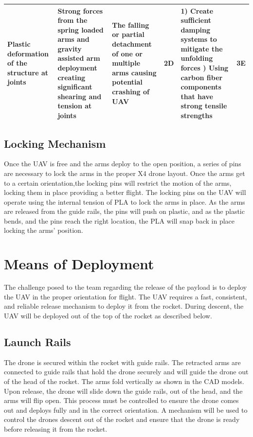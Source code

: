 \begin{table}[]
{\begin{tabularx}{\linewidth}{XXXlXl}
                Plastic deformation of the structure at joints & Strong forces from the spring loaded arms and gravity assisted arm deployment creating significant shearing and tension at joints & The falling or partial detachment of one or multiple arms causing potential crashing of UAV & \cellcolor{orange!25} 2D & 1) Create sufficient damping systems to mitigate the unfolding forces \newline 2) Using carbon fiber components that have strong tensile strengths & \cellcolor{green!25} 3E \\
                \bottomrule
                \end{tabularx}
                }
            \end{table}
	
	\subsection{Locking Mechanism}
    Once the UAV is free and the arms deploy to the open position, a series of pins are necessary to lock the arms in the proper X4 drone layout.  Once the arms get to a certain orientation,the locking pins will restrict the motion of the arms, locking them in place providing a better flight.  The locking pins on the UAV will operate using the internal tension of PLA to lock the arms in place.  As the arms are released from the guide rails, the pins will push on plastic, and as the plastic bends, and the pins reach the right location, the PLA will snap back in place locking the arms’ position.   


\section{Means of Deployment}\label{PL:Tradeoffs:Deployment}
	The challenge posed to the team regarding the release of the payload is to deploy the UAV in the proper orientation for flight. The UAV requires a fast, consistent, and reliable release mechanism to deploy it from the rocket. During descent, the UAV will be deployed out of the top of the rocket as described below. 

	\subsection{Launch Rails}
		The drone is secured within the rocket with guide rails. The retracted arms are connected to guide rails that hold the drone securely and will guide the drone out of the head of the rocket. The arms fold vertically as shown in the CAD models. Upon release, the drone will slide down the guide rails, out of the head, and the arms will flip open. This process must be controlled to ensure the drone comes out and deploys fully and in the correct orientation. A mechanism will be used to control the drones descent out of the rocket and ensure that the drone is ready before releasing it from the rocket.

